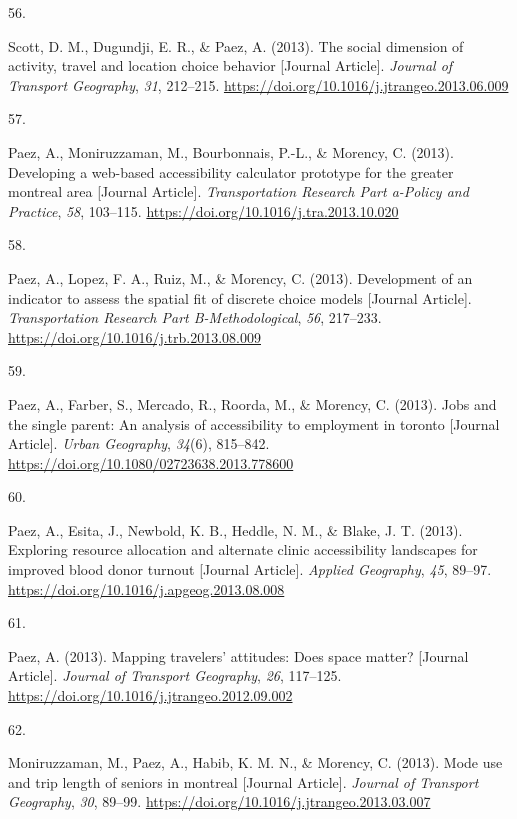 \documentclass[10pt,a4paper,]{twentysecondcv}
\newlength{\csllabelwidth}
\newcommand{\CSLLeftMargin}[1]{\parbox[t]{\csllabelwidth}{#1}}
\newcommand{\CSLRightInline}[1]{\parbox[t]{\linewidth - \csllabelwidth}{#1}}
\begin{document}
\leavevmode{}%
\CSLLeftMargin{56. }%
\CSLRightInline{Scott, D. M., Dugundji, E. R., \& Paez, A. (2013). The
social dimension of activity, travel and location choice behavior
{[}Journal Article{]}. \emph{Journal of Transport Geography}, \emph{31},
212--215. \url{https://doi.org/10.1016/j.jtrangeo.2013.06.009}}

\leavevmode{}%
\CSLLeftMargin{57. }%
\CSLRightInline{Paez, A., Moniruzzaman, M., Bourbonnais, P.-L., \&
Morency, C. (2013). Developing a web-based accessibility calculator
prototype for the greater montreal area {[}Journal Article{]}.
\emph{Transportation Research Part a-Policy and Practice}, \emph{58},
103--115. \url{https://doi.org/10.1016/j.tra.2013.10.020}}

\leavevmode{}%
\CSLLeftMargin{58. }%
\CSLRightInline{Paez, A., Lopez, F. A., Ruiz, M., \& Morency, C. (2013).
Development of an indicator to assess the spatial fit of discrete choice
models {[}Journal Article{]}. \emph{Transportation Research Part
B-Methodological}, \emph{56}, 217--233.
\url{https://doi.org/10.1016/j.trb.2013.08.009}}

\leavevmode{}%
\CSLLeftMargin{59. }%
\CSLRightInline{Paez, A., Farber, S., Mercado, R., Roorda, M., \&
Morency, C. (2013). Jobs and the single parent: An analysis of
accessibility to employment in toronto {[}Journal Article{]}.
\emph{Urban Geography}, \emph{34}(6), 815--842.
\url{https://doi.org/10.1080/02723638.2013.778600}}

\leavevmode{}%
\CSLLeftMargin{60. }%
\CSLRightInline{Paez, A., Esita, J., Newbold, K. B., Heddle, N. M., \&
Blake, J. T. (2013). Exploring resource allocation and alternate clinic
accessibility landscapes for improved blood donor turnout {[}Journal
Article{]}. \emph{Applied Geography}, \emph{45}, 89--97.
\url{https://doi.org/10.1016/j.apgeog.2013.08.008}}

\leavevmode{}%
\CSLLeftMargin{61. }%
\CSLRightInline{Paez, A. (2013). Mapping travelers' attitudes: Does
space matter? {[}Journal Article{]}. \emph{Journal of Transport
Geography}, \emph{26}, 117--125.
\url{https://doi.org/10.1016/j.jtrangeo.2012.09.002}}

\leavevmode{}%
\CSLLeftMargin{62. }%
\CSLRightInline{Moniruzzaman, M., Paez, A., Habib, K. M. N., \& Morency,
C. (2013). Mode use and trip length of seniors in montreal {[}Journal
Article{]}. \emph{Journal of Transport Geography}, \emph{30}, 89--99.
\url{https://doi.org/10.1016/j.jtrangeo.2013.03.007}}
\end{document}
